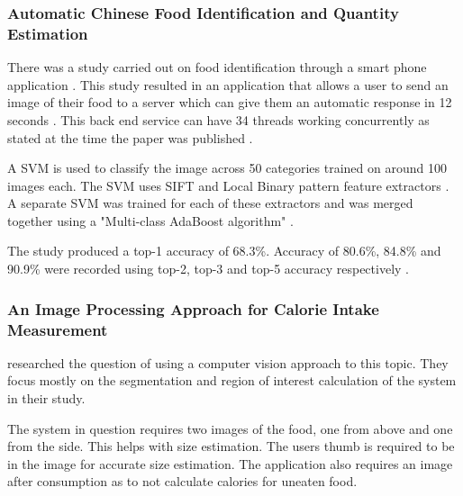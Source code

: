 
\subsubsection*{Automatic Chinese Food Identification and Quantity Estimation}
There was a study carried out on food identification through a smart phone application \parencite{chen2012automatic}. This study resulted in an application that allows a user to send an image of their food to a server which can give them an automatic response in 12 seconds \parencite{chen2012automatic}. This back end service can have 34 threads working concurrently as stated at the time the paper was published \parencite{chen2012automatic}.

A SVM is used to classify the image across 50 categories trained on around 100 images each.
The SVM uses SIFT and Local Binary pattern feature extractors \parencite{chen2012automatic}.
A separate SVM was trained for each of these extractors and was merged together using a "Multi-class AdaBoost algorithm" \parencite{chen2012automatic}.

The study produced a top-1 accuracy  of 68.3\%. Accuracy of 80.6\%, 84.8\% and 90.9\% were recorded using top-2, top-3 and top-5 accuracy respectively \parencite{chen2012automatic}. 


\subsubsection*{An Image Processing Approach for Calorie Intake Measurement}
\parencite{villalobos2012image} researched the question of using a computer vision approach to this topic. They focus mostly on the segmentation and region of interest calculation of the system in their study.

The system in question requires two images of the food, one from above and one from the side. This helps with size estimation. The users thumb is required to be in the image for accurate size estimation. The application also requires an image after consumption as to not calculate calories for uneaten food.

